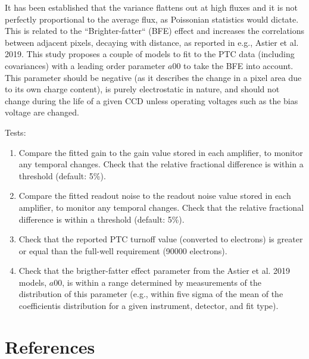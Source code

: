 \documentclass[DM,authoryear,toc,lsstdraft]{lsstdoc}
\begin{document}
It has been established that the variance flattens out at high fluxes and it is not perfectly proportional to the average flux, as Poissonian statistics would dictate. This is related to the ``Brighter-fatter`` (BFE) effect and increases the correlations between adjacent pixels, decaying with distance, as reported in e.g., Astier et al. 2019. This study proposes a couple of models to fit to the PTC data (including covariances) with a leading order parameter $a00$ to take the BFE into account. This parameter should be negative (as it describes the change in a pixel area due to its own charge content), is purely electrostatic in nature, and should not change during the life of a given CCD unless operating voltages such as the bias voltage are changed.

Tests:
\begin{enumerate}
\item Compare the fitted gain to the gain value stored in each amplifier, to monitor any temporal changes. Check that the relative fractional difference is within a threshold (default: 5\%).
\item Compare the fitted readout noise to the readout noise value stored in each amplifier, to monitor any temporal changes. Check that the relative fractional difference is within a threshold (default: 5\%).
\item Check that the reported PTC turnoff value (converted to electrons) is greater or equal than the full-well requirement (90000 electrons).
\item Check that the brigther-fatter effect parameter from the Astier et al. 2019 models, $a00$, is within a range determined by measurements of the distribution of this parameter (e.g., within five sigma of the mean of the coefficientis distribution for a given instrument, detector, and fit type).
\end{enumerate}

\appendix

\section{References}
\label{sec:bib}

\end{document}
